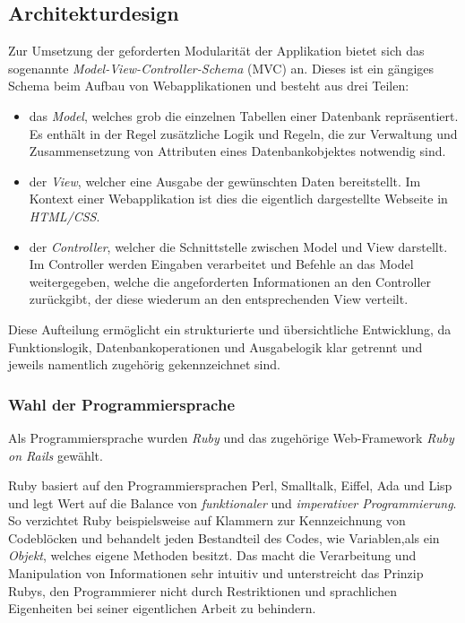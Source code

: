 \subsection{Architekturdesign}
\label{sec:Architekturdesign}
Zur Umsetzung der geforderten Modularität der Applikation bietet sich das sogenannte
\textit{Model-View-Controller-Schema} (\acs{MVC}) an. Dieses ist ein gängiges Schema beim Aufbau von
Webapplikationen und besteht aus drei Teilen:
\begin{itemize}
	\item das \textit{Model}, welches grob die einzelnen Tabellen einer Datenbank repräsentiert. Es enthält in
	der Regel zusätzliche Logik und Regeln, die zur Verwaltung und Zusammensetzung von Attributen
	eines Datenbankobjektes notwendig sind.
	\item der \textit{View}, welcher eine Ausgabe der gewünschten Daten bereitstellt. Im Kontext einer
	Webapplikation ist dies die eigentlich dargestellte Webseite in \textit{HTML/CSS}.
	\item der \textit{Controller}, welcher die Schnittstelle zwischen Model und View darstellt.
	Im Controller werden Eingaben verarbeitet und Befehle an das Model weitergegeben, welche
	die angeforderten Informationen an den Controller zurückgibt, der diese wiederum an den
	entsprechenden View verteilt.
\end{itemize}
Diese Aufteilung ermöglicht ein strukturierte und übersichtliche Entwicklung, da Funktionslogik,
Datenbankoperationen und Ausgabelogik klar getrennt und jeweils namentlich zugehörig gekennzeichnet
sind.


\subsubsection{Wahl der Programmiersprache}
\label{sec:Wahl der Programmiersprache}
Als Programmiersprache wurden \textit{Ruby} und das zugehörige Web-Framework \textit{Ruby on Rails}
gewählt.

Ruby basiert auf den Programmiersprachen Perl, Smalltalk, Eiffel, Ada und Lisp und legt Wert auf
die Balance von \textit{funktionaler} und \textit{imperativer Programmierung}. So verzichtet Ruby
beispielsweise auf Klammern zur Kennzeichnung von Codeblöcken und behandelt jeden Bestandteil des
Codes, wie Variablen,als ein \textit{Objekt}, welches eigene Methoden besitzt. Das macht die
Verarbeitung und Manipulation von Informationen sehr intuitiv und unterstreicht das Prinzip Rubys,
den Programmierer nicht durch Restriktionen und sprachlichen Eigenheiten bei seiner eigentlichen
Arbeit zu behindern.


